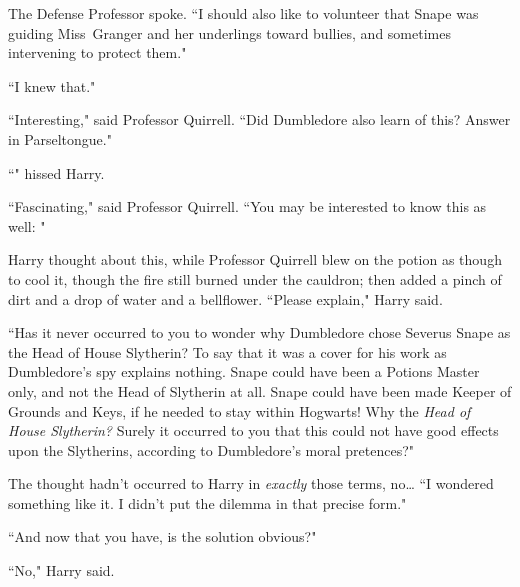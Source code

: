 The Defense Professor spoke. ``I should also like to volunteer that Snape was guiding Miss~Granger and her underlings toward bullies, and sometimes intervening to protect them."

``I knew that."

``Interesting," said Professor Quirrell. ``Did Dumbledore also learn of this? Answer in Parseltongue."

``" hissed Harry.

``Fascinating," said Professor Quirrell. ``You may be interested to know this as well: "

Harry thought about this, while Professor Quirrell blew on the potion as though to cool it, though the fire still burned under the cauldron; then added a pinch of dirt and a drop of water and a bellflower. ``Please explain," Harry said.

``Has it never occurred to you to wonder why Dumbledore chose Severus Snape as the Head of House Slytherin? To say that it was a cover for his work as Dumbledore's spy explains nothing. Snape could have been a Potions Master only, and not the Head of Slytherin at all. Snape could have been made Keeper of Grounds and Keys, if he needed to stay within Hogwarts! Why the \emph{Head of House Slytherin?} Surely it occurred to you that this could not have good effects upon the Slytherins, according to Dumbledore's moral pretences?"

The thought hadn't occurred to Harry in \emph{exactly} those terms, no{\ldots} ``I wondered something like it. I didn't put the dilemma in that precise form."

``And now that you have, is the solution obvious?"

``No," Harry said.


